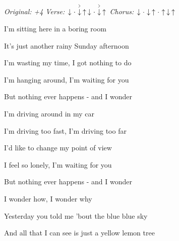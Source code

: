 \begin{song}


\begin{headerbox}
\RaiseBoxWithAccents
\textit{Original: +4} \quad
\textit{Verse:} $\Down\Miss\AccentDown\Up \Down\Miss\AccentDown\Up$ \quad
\textit{Chorus:} $\Down\Miss\Down\Up\Miss\Up\Down\Up$
\end{headerbox}

\begin{hchordbox}
\end{hchordbox}

\large


\bigskip

I'm sitting here in a boring room \par
It's just another rainy Sunday afternoon \par
I'm wasting my time, I got nothing to do \par
I'm hanging around, I'm waiting for you \par
But nothing ever happens -  and I wonder   \par

\bigskip

I'm driving around in my car \par
I'm driving too fast, I'm driving too far \par
I'd like to change my point of view \par
I feel so lonely, I'm waiting for you \par
But nothing ever happens -  and I wonder   \par

\bigskip

\begin{chorusbox}{\Chorus}
I wonder how, I wonder why \par
{}Yesterday you told me 'bout the blue blue sky \par
And all that I can see is just a yellow lemon tree  \par


\end{chorusbox}
\end{song}

